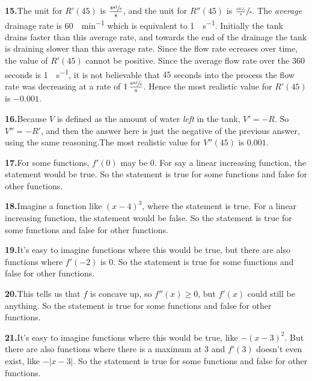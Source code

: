 \documentclass[10pt,oneside,]{book}
\theoremstyle{plain}
\theoremstyle{definition}
\numberwithin{equation}{section}
\newcommand{\fe}[2]{#1\mathopen{}\left(#2\right)\mathclose{}}
\newcommand{\fd}[1]{#1'}
\newcommand{\sd}[1]{#1''}
\begin{document}
\par\smallskip
\noindent\textbf{15.}\quad{}The unit for \(\fe{\fd{R}}{45}\) is \(\frac{\sfrac{\text{gal}}{\text{s}}}{\text{s}}\), and the unit for \(\fe{\sd{R}}{45}\) is \(\sfrac{\frac{\sfrac{\text{gal}}{\text{s}}}{\text{s}}}{\text{s}}\). The \emph{average} drainage rate is \SI{60}{\gallon\per\minute} which is equivalent to \SI{1}{\gallon\per\second}. Initially the tank drains faster than this average rate, and towards the end of the drainage the tank is draining slower than this average rate.  Since the flow rate ecreases over time, the value of \(\fe{\fd{R}}{45}\) cannot be positive. Since the average flow rate over the \(360\) seconds is \SI{1}{\gallon\per\second}, it is not believable that \(45\) seconds into the process the flow rate was decreasing at a rate of \(1\,\frac{\sfrac{\text{gal}}{\text{s}}}{\text{s}}\).   Hence the most realistic value for \(\fe{\fd{R}}{45}\) is \(-0.001\).%
\par\smallskip
\noindent\textbf{16.}\quad{}Because \(V\) is defined as the amount of water \emph{left} in the tank, \(\fd{V}=-R\). So \(\sd{V}=-\fd{R}\), and then the answer here is just the negative of the previous answer, using the same reasoning.The most realistic value for \(\fe{\sd{V}}{45}\) is \(0.001\).%
\par\smallskip
\noindent\textbf{17.}\quad{}For some functions, \(\fe{\fd{f}}{0}\) may be \(0\). For say a linear increasing function, the statement would be true. So the statement is true for some functions and false for other functions.%
\par\smallskip
\noindent\textbf{18.}\quad{}Imagine a function like \((x-4)^3\), where the statement is true. For a linear increasing function, the statement would be false. So the statement is true for some functions and false for other functions.%
\par\smallskip
\noindent\textbf{19.}\quad{}It's easy to imagine functions where this would be true, but there are also functions where \(\fe{\fd{f}}{-2}\) is \(0\). So the statement is true for some functions and false for other functions.%
\par\smallskip
\noindent\textbf{20.}\quad{}This tells us that \(f\) is concave up, so \(\fe{\sd{f}}{x}\geq0\), but \(\fe{\fd{f}}{x}\) could still be anything. So the statement is true for some functions and false for other functions.%
\par\smallskip
\noindent\textbf{21.}\quad{}It's easy to imagine functions where this would be true, like \(-(x-3)^2\). But there are also functions where there is a maximum at \(3\) and \(\fe{\fd{f}}{3}\) doesn't even exist, like \(-|x-3|\). So the statement is true for some functions and false for other functions.%
\end{document}
